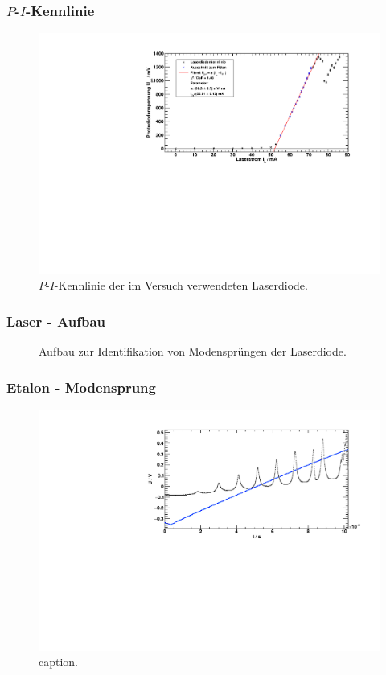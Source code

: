 \begin{frame}
\frametitle{$P$-$I$-Kennlinie}

\begin{figure}[H]
\begin{center}
  \includegraphics[width=\textwidth]{../img/diodenkennlinie.pdf}
  \caption{$P$-$I$-Kennlinie der im Versuch verwendeten Laserdiode.}
\end{center}
\end{figure}

\end{frame}


\begin{frame}
\frametitle{Laser - Aufbau}

\begin{figure}
    \centering
    \def\svgwidth{\textwidth}
    
    \caption{Aufbau zur Identifikation von Modensprüngen der Laserdiode.}
\end{figure}

\end{frame}


\begin{frame}
\frametitle{Etalon - Modensprung}

\begin{figure}[H]
\begin{center}
  \includegraphics[width=\textwidth]{../img/up-etalon_zoom.pdf}
  \caption{caption.}
\end{center}
\end{figure}

\end{frame}

